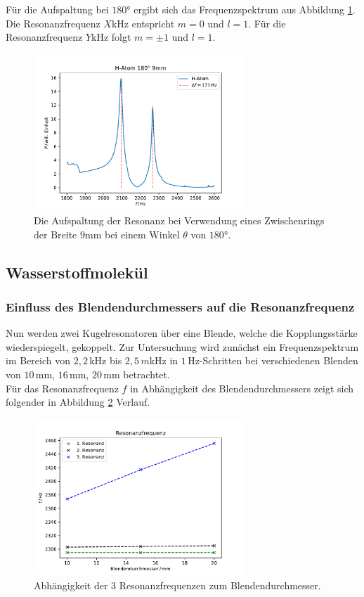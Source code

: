 Für die Aufspaltung bei $180°$ ergibt sich das Frequenzspektrum aus Abbildung \ref{fig:9mm_res}.
Die Resonanzfrequenz $X$kHz entspricht $m=0$ und $l=1$. Für die Resonanzfrequenz $Y$kHz folgt $m=\pm 1$ und $l=1$.
\begin{figure}[H]
    \center
    \includegraphics[width=0.7\textwidth]{plots/Hatom/zustandsaufspaltung_9.pdf}
    \caption{Die Aufspaltung der Resonanz bei Verwendung eines Zwischenrings der Breite $9$mm bei einem Winkel $\theta$ von $180°$.}
    \label{fig:9mm_res}
\end{figure}
\newpage
\subsection{Wasserstoffmolekül}
\subsubsection*{Einfluss des Blendendurchmessers auf die Resonanzfrequenz}
Nun werden zwei Kugelresonatoren über eine Blende, welche die Kopplungsstärke wiederspiegelt, gekoppelt.
Zur Untersuchung wird zunächst ein Frequenzspektrum im Bereich von $2,2\,$kHz bis $2,5\,m$kHz in $1\,$Hz-Schritten bei verschiedenen
Blenden von $10\,$mm, $16\,$mm, $20\,$mm betrachtet.\\

Für das Resonanzfrequenz $f$ in Abhängigkeit des Blendendurchmessers zeigt sich folgender in Abbildung \ref{fig:blende_mol}
Verlauf.
\begin{figure}[H]
    \center
    \includegraphics[width=0.7\textwidth]{plots/Hatom/res_blende.pdf}
    \caption{Abhängigkeit der 3 Resonanzfrequenzen zum Blendendurchmesser.}
    \label{fig:blende_mol}
\end{figure}

